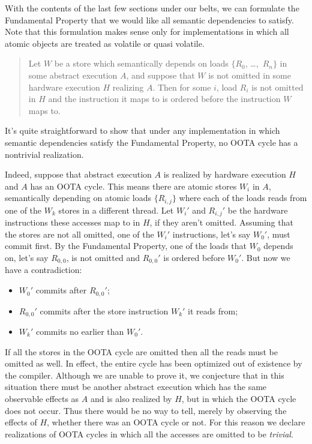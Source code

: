 \documentclass[10]{article}
\begin{document}
With the contents of the last few sections under our belts, we can
formulate the Fundamental Property that we would like all semantic
dependencies to satisfy.
Note that this formulation makes sense only for implementations in
which all atomic objects are treated as volatile or quasi volatile.
\begin{quote}
Let $W$ be a store which semantically depends on loads
$\{R_0$, \ldots,~$R_n\}$ in some abstract execution $A$,
and suppose that $W$ is not
omitted in some hardware execution $H$ realizing $A$.
Then for some $i$, load $R_i$ is not omitted in $H$ and the
instruction it maps to is ordered before the instruction $W$ maps to.
\end{quote}
It's quite straightforward to show that under any implementation in which
semantic dependencies satisfy the Fundamental Property, no OOTA cycle
has a nontrivial realization.

Indeed, suppose that abstract execution $A$ is realized by hardware
execution $H$ and $A$ has an OOTA cycle.
This means there are atomic stores $W_i$ in $A$,
semantically depending on atomic loads
$\{R_{i,j}\}$ where each of the loads reads from one of the $W_k$
stores in a different thread.
Let $W_i'$ and $R_{i,j}'$ be the hardware instructions these accesses
map to in $H$, if they aren't omitted.
Assuming that the stores are not all omitted,
one of the $W_i'$ instructions, let's say $W_0'$, must commit first.
By the Fundamental Property, one of the loads that $W_0$ depends on,
let's say $R_{0,0}$, is not omitted and $R_{0,0}'$ is ordered before $W_0'$.
But now we have a contradiction:
\begin{itemize}
\item	$W_0'$ commits after $R_{0,0}'$;
\item	$R_{0,0}'$ commits after the store instruction $W_k'$ it reads from;
\item	$W_k'$ commits no earlier than $W_0'$.
\end{itemize}

If all the stores in the OOTA cycle are omitted then all the reads
must be omitted as well.
In effect, the entire cycle has been optimized
out of existence by the compiler.
Although we are unable to prove it, we conjecture that in this
situation there must be another abstract execution which has the
same observable effects as $A$ and is also realized by $H$, but in
which the OOTA cycle does not occur.
Thus there would be no way to tell, merely by observing the effects of
$H$, whether there was an OOTA cycle or not.
For this reason we declare realizations of OOTA cycles in which
all the accesses are omitted to be \emph{trivial}.
\end{document}
